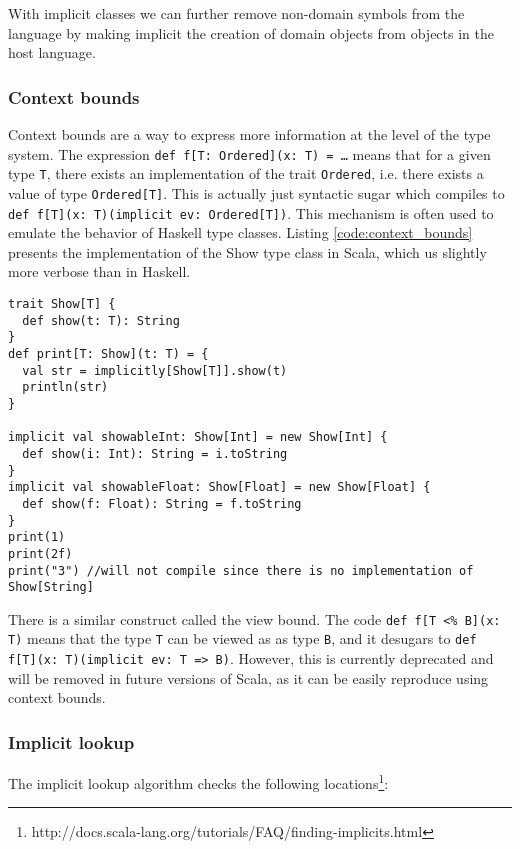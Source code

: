 With implicit classes we can further remove non-domain symbols from the language by making implicit the creation of domain objects from objects in the host language.

\subsubsection{Context bounds}
Context bounds are a way to express more information at the level of the type system.
The expression \texttt{def f[T: Ordered](x: T) = \ldots} means that for a given type \texttt{T}, there exists an implementation of the trait \texttt{Ordered}, i.e. there exists a value of type \texttt{Ordered[T]}.
This is actually just syntactic sugar which compiles to \texttt{def f[T](x: T)(implicit ev: Ordered[T])}.
This mechanism is often used to emulate the behavior of Haskell type classes.
Listing \ref{code:context_bounds} presents the implementation of the Show type class in Scala, which us slightly more verbose than in Haskell.

\begin{lstlisting}[caption=Context bounds, label=code:context_bounds, float]
trait Show[T] {
  def show(t: T): String
}
def print[T: Show](t: T) = {
  val str = implicitly[Show[T]].show(t)
  println(str)
}

implicit val showableInt: Show[Int] = new Show[Int] {
  def show(i: Int): String = i.toString
}
implicit val showableFloat: Show[Float] = new Show[Float] {
  def show(f: Float): String = f.toString
}
print(1)
print(2f)
print("3") //will not compile since there is no implementation of Show[String]
\end{lstlisting}

There is a similar construct called the view bound.
The code \texttt{def f[T <\% B](x: T)} means that the type \texttt{T} can be viewed as as type \texttt{B}, and it desugars to \texttt{def f[T](x: T)(implicit ev: T => B)}.
However, this is currently deprecated and will be removed in future versions of Scala, as it can be easily reproduce using context bounds.

\subsubsection{Implicit lookup}

The implicit lookup algorithm checks the following locations\footnote{http://docs.scala-lang.org/tutorials/FAQ/finding-implicits.html}: 

